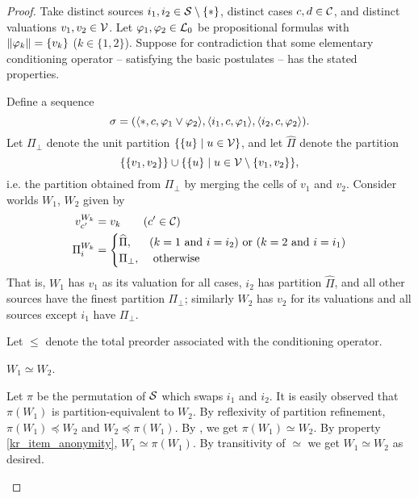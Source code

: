 \begin{proof}
    Take distinct sources $i_1, i_2 \in \mathcal{S} \setminus \{\ast\}$, distinct cases
    $c, d \in \mathcal{C}$, and distinct valuations $v_1, v_2 \in \mathcal{V}$. Let $\varphi_1,
    \varphi_2 \in \mathcal{L}{}_0$ be propositional formulas with $\|{\varphi_k}\| =
    \{v_k\}$
    ($k \in \{1, 2\}$). Suppose for contradiction that some elementary
    conditioning operator -- satisfying the basic postulates -- has the stated
    properties.

    Define a sequence
    \[
        \sigma
        = (
            \langle {\ast, c, \varphi_1 \lor \varphi_2} \rangle,
            \langle {i_1, c, \varphi_1} \rangle,
            \langle {i_2, c, \varphi_2} \rangle
        ).
    \]
    Let $\Pi_\bot$ denote the unit partition $\{\{u\} \mid u \in \mathcal{V}\}$, and
    let $\widehat{\Pi}$ denote the partition
    \[
         \{\{v_1, v_2\}\}
         \cup
         \{\{u\} \mid u \in \mathcal{V} \setminus \{v_1, v_2\}\},
    \]
    i.e. the partition obtained from $\Pi_\bot$ by merging the cells of $v_1$
    and $v_2$.
    Consider worlds $W_1$, $W_2$ given by
    \begin{align*}
         v^{W_k}_{c'} &= v_k \qquad (c' \in \mathcal{C}) \\
         \Pi^{W_k}_i &= \begin{cases}
            \widehat{\Pi},&
                (k = 1 \text{ and } i = i_2)
                \text { or }
                (k = 2 \text{ and } i = i_1) \\
            \Pi_\bot,& \text{ otherwise }
         \end{cases}
    \end{align*}
    That is, $W_1$ has $v_1$ as its valuation for all cases, $i_2$ has
    partition $\widehat{\Pi}$, and all other sources have the finest partition
    $\Pi_\bot$; similarly $W_2$ has $v_2$ for its valuations and all sources
    except $i_1$ have $\Pi_\bot$.

    Let $\le$ denote the total preorder associated with the conditioning
    operator.

        \begin{claim}
            \label{kr_claim_w1_simeq_w2}
            $W_1 \simeq W_2$.
        \end{claim}
        \begin{claimproof}
            Let $\pi$ be the permutation of $\mathcal{S}$ which swaps $i_1$ and $i_2$.
            It is easily observed that $\pi(W_1)$ is partition-equivalent to
            $W_2$. By reflexivity of partition refinement, $\pi(W_1) \preceq
            W_2$ and $W_2 \preceq \pi(W_1)$. By , we get $\pi(W_1)
            \simeq W_2$. By property \cref{kr_item_anonymity}, $W_1 \simeq
            \pi(W_1)$. By transitivity of ${\simeq}$ we get $W_1 \simeq W_2$ as
            desired.
        \end{claimproof}


\end{proof}
